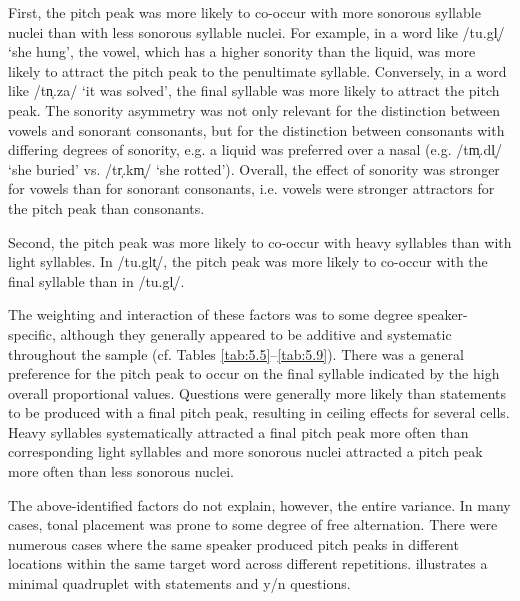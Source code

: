 First, the pitch peak was more likely to co-occur with more sonorous syllable nuclei than with less sonorous syllable nuclei. For example, in a word like /tu.gl̩/ ‘she hung’, the vowel, which has a higher sonority than the liquid, was more likely to attract the pitch peak to the penultimate syllable. Conversely, in a word like /tn̩.za/ ‘it was solved’, the final syllable was more likely to attract the pitch peak. The sonority asymmetry was not only relevant for the distinction between vowels and sonorant consonants, but for the distinction between consonants with differing degrees of sonority, e.g. a liquid was preferred over a nasal (e.g. /tm̩.dl̩/ ‘she buried’ vs. /tr̩.km̩/ ‘she rotted’). Overall, the effect of sonority was stronger for vowels than for sonorant consonants, i.e. vowels were stronger attractors for the pitch peak than consonants.

Second, the pitch peak was more likely to co-occur with heavy syllables than with light syllables. In /tu.glt̩/, the pitch peak was more likely to co-occur with the final syllable than in /tu.gl̩/.

The weighting and interaction of these factors was to some degree speaker-specific, although they generally appeared to be additive and systematic throughout the sample (cf. Tables \ref{tab:5.5}--\ref{tab:5.9}). There was a general preference for the pitch peak to occur on the final syllable indicated by the high overall proportional values. Questions were generally more likely than statements to be produced with a final pitch peak, resulting in ceiling effects for several cells. Heavy syllables systematically attracted a final pitch peak more often than corresponding light syllables and more sonorous nuclei attracted a pitch peak more often than less sonorous nuclei. 

The above-identified factors do not explain, however, the entire variance. In many cases, tonal placement was prone to some degree of free alternation. There were numerous cases where the same speaker produced pitch peaks in different locations within the same target word across different repetitions.  illustrates a minimal quadruplet with statements and y/n questions.

